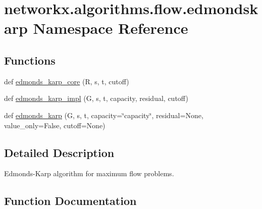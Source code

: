 \hypertarget{namespacenetworkx_1_1algorithms_1_1flow_1_1edmondskarp}{}\section{networkx.\+algorithms.\+flow.\+edmondskarp Namespace Reference}
\label{namespacenetworkx_1_1algorithms_1_1flow_1_1edmondskarp}
\subsection*{Functions}
\begin{DoxyCompactItemize}
\item 
def \hyperlink{namespacenetworkx_1_1algorithms_1_1flow_1_1edmondskarp_a8ad535e6f5f7ff7e85af78afcb1e9c6e}{edmonds\+\_\+karp\+\_\+core} (R, s, t, cutoff)
\item 
def \hyperlink{namespacenetworkx_1_1algorithms_1_1flow_1_1edmondskarp_ae76282a2098693f7b0b9eb1c94385fb3}{edmonds\+\_\+karp\+\_\+impl} (G, s, t, capacity, residual, cutoff)
\item 
def \hyperlink{namespacenetworkx_1_1algorithms_1_1flow_1_1edmondskarp_abefa5f3573116212196fc1d727542591}{edmonds\+\_\+karp} (G, s, t, capacity=\char`\"{}capacity\char`\"{}, residual=None, value\+\_\+only=False, cutoff=None)
\end{DoxyCompactItemize}


\subsection{Detailed Description}
\begin{DoxyVerb}Edmonds-Karp algorithm for maximum flow problems.
\end{DoxyVerb}
 

\subsection{Function Documentation}
\mbox{\label{namespacenetworkx_1_1algorithms_1_1flow_1_1edmondskarp_abefa5f3573116212196fc1d727542591}} 
